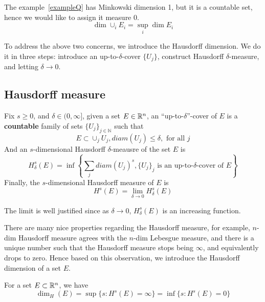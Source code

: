 \begin{note}
    The example~\ref{exampleQ} has Minkowski dimension 1, but it is a countable set, hence we would like to assign it measure 0.
    \begin{equation*}
        \dim\cup_iE_i=\sup_{i}\dim E_i
    \end{equation*}
\end{note}
To address the above two concerns, we introduce the Hausdorff dimension. We do it in three steps: introduce an up-to-$\delta$-cover $\{U_j\}$, construct Hausdorff $\delta$-measure, and letting $\delta\to 0$.
\subsection{Hausdorff measure}
\begin{definition}
    Fix $s\geq 0$, and $\delta\in(0,\infty]$, given a set $E\in\mathbb{R}^n$, an ``up-to-$\delta$''-cover of $E$ is a \textbf{countable} family of sets $\{U_j\}_{j\in\mathbb{N}}$ such that
    \begin{equation*}
        E\subset\cup_jU_j, diam(U_j)\leq\delta, \text{ for all } j
    \end{equation*}
    And an $s$-dimensional Hausdorff $\delta$-meausre of the set $E$ is
    \begin{equation*}
        H_\delta^s(E)=\inf\left\{\sum_jdiam(U_j)^s, \{U_j\}_j \text{ is an up-to-$\delta$-cover of } E \right\}
    \end{equation*}
    Finally, the $s$-dimensional Hausdorff measure of $E$ is
    \begin{equation*}
        H^s(E)=\lim_{\delta\to 0}H_\delta^s(E)
    \end{equation*}
\end{definition}
\begin{remark}
    The limit is well justified since as $\delta\to 0$, $H_\delta^s(E)$ is an increasing function.
\end{remark}
There are many nice properties regarding the Hausdorff measure, for example, $n$-dim Hausdorff measure agrees with the $n$-dim Lebesgue measure, and there is a unique number such that the Hausdorff measure stops being $\infty$, and equivalently drops to zero. Hence based on this observation, we introduce the Hausdorff dimension of a set $E$.
\begin{definition}
    For a set $E\subset\mathbb{R}^n$, we have
    \begin{equation*}
        \dim_H(E)=\sup\{s: H^s(E)=\infty\}=\inf\{s: H^s(E)=0\}
    \end{equation*}
\end{definition}

